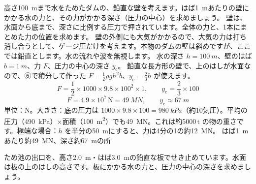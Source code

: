 \begin{phreidai}[ダムの壁にかかる力]
\label{ph:力-12:ex7}高さ\qty{100}{m}まで水をためたダムの、鉛直な壁を考えます。はば\qty{1}{m}あたりの壁にかかる水の力と、その力がかかる深さ（圧力の中心）を求めましょう。
\phbamen
壁は、水面から底まで、深さに比例する圧力で押されています。全体の力と、1本にまとめた力の位置を求めます。
\phmushi
壁の外側にも大気がかかるので、大気の力は打ち消し合うとして、ゲージ圧だけを考えます。本物のダムの壁は斜めですが、ここでは鉛直とします。水の流れや波を無視します。
\phzu
水の深さ $h=\qty{100}{m}$、壁のはば $b=\qty{1}{m}$、力 $F$、圧力の中心の深さ $y_{\mathrm{c}}$。
\phriyu
鉛直な長方形の壁で、上のはしが水面なので、⑥で積分して作った $F=\tfrac{1}{2}\rho gh^2b$、$y_{\mathrm{c}}=\tfrac{2}{3}h$ が使えます。
\phtateru
\[ F=\frac{1}{2}\times1000\times9.8\times100^2\times1,\qquad y_{\mathrm{c}}=\frac{2}{3}\times100 \]
\phtoku
\[ F=4.9\times10^7\,\mathrm{N}=\qty{49}{MN},\qquad y_{\mathrm{c}}\approx\qty{67}{m} \]
\phtashikame
単位：N。大きさ：底の圧力は $1000\times9.8\times100=\qty{980}{kPa}$（約10気圧）。平均の圧力（\qty{490}{kPa}）×面積（\qty{100}{m^2}）でも\qty{49}{MN}。これは約\num{5000}\,t の物の重さです。極端な場合：$h$ を半分の\qty{50}{m}にすると、力は4分の1の約\qty{12}{MN}。
\kotae はば\qty{1}{m}あたり約\qty{49}{MN}、深さ約\qty{67}{m}の所
\end{phreidai}
\begin{jibun}
ため池の出口を、高さ\qty{2.0}{m}・はば\qty{3.0}{m}の鉛直な板でせき止めています。水面は板の上のはしの高さです。板にかかる水の力と、圧力の中心の深さを求めましょう。
\end{jibun}


